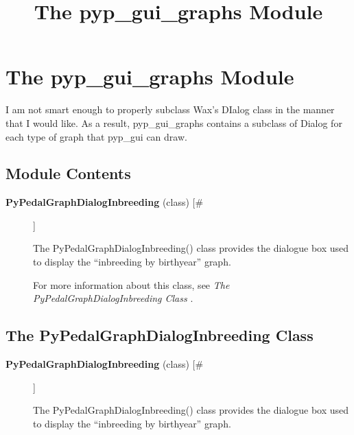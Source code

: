 \documentclass[10pt]{article}
\title{The pyp\_gui\_graphs Module}
\begin{document}
\section*{The pyp\_gui\_graphs Module}


 I am not smart enough to properly subclass Wax's DIalog class in the manner that I would like. As a result, pyp\_gui\_graphs contains a subclass of Dialog for each type of graph that pyp\_gui can draw.
\subsection*{Module Contents}
\begin{description}
\item[\textbf{PyPedalGraphDialogInbreeding}
 (class) [\#]]

 The PyPedalGraphDialogInbreeding() class provides the dialogue box used to display the ``inbreeding by birthyear'' graph.


 For more information about this class, see \emph{The PyPedalGraphDialogInbreeding Class}
.


\end{description}
\subsection*{The PyPedalGraphDialogInbreeding Class}
\begin{description}
\item[\textbf{PyPedalGraphDialogInbreeding}
 (class) [\#]]

 The PyPedalGraphDialogInbreeding() class provides the dialogue box used to display the ``inbreeding by birthyear'' graph.


\end{description}
\end{document}
